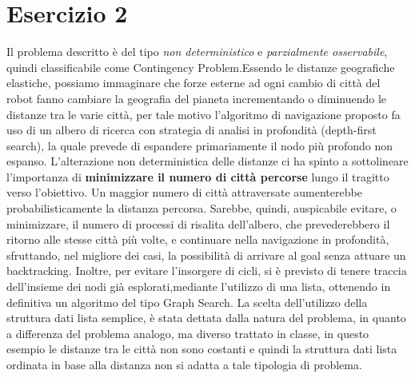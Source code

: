 	\section{Esercizio 2}
		\label{sec:es2}
		Il problema descritto è del tipo \emph{non deterministico} e \emph{parzialmente osservabile}, quindi classificabile come \textsf{Contingency Problem}.Essendo le distanze geografiche  elastiche, possiamo immaginare che forze esterne ad ogni cambio di città del robot fanno cambiare la geografia del pianeta incrementando o diminuendo le distanze tra le varie città, per tale motivo l'algoritmo di navigazione proposto fa uso di un albero di ricerca con strategia di analisi in profondità (\textsf{depth-first search}), la quale prevede di espandere primariamente il nodo più profondo non espanso.
		\newline
		 L'alterazione non deterministica delle distanze ci ha spinto a sottolineare l'importanza di \textbf{minimizzare il numero di città percorse} lungo il tragitto verso l'obiettivo. Un maggior numero di città attraversate aumenterebbe probabilisticamente la distanza percorsa. Sarebbe, quindi, auspicabile evitare, o minimizzare, il numero di processi di risalita dell'albero, che prevederebbero il ritorno alle stesse città più volte, e continuare nella navigazione in profondità, sfruttando, nel migliore dei casi, la possibilità di arrivare al \textsf{goal} senza attuare un \textsf{backtracking}. Inoltre, per evitare l'insorgere di cicli, si è previsto di tenere traccia dell'insieme dei nodi già esplorati,mediante l'utilizzo di una lista, ottenendo in definitiva un algoritmo del tipo \textsf{Graph Search}.
La scelta dell'utilizzo della struttura dati lista semplice, è stata dettata dalla natura del problema, in quanto a differenza del problema analogo, ma diverso trattato in classe, in questo esempio le distanze tra le città non sono costanti e quindi la struttura dati lista ordinata in base alla distanza non si adatta a tale tipologia di problema.
